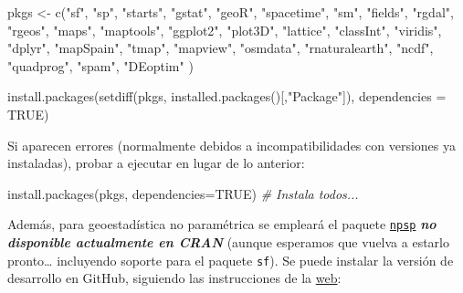 \documentclass[
  spanish,
]{book}
\newenvironment{Shaded}{\begin{snugshade}}{\end{snugshade}}
\newcommand{\AttributeTok}[1]{\textcolor[rgb]{0.77,0.63,0.00}{#1}}
\newcommand{\CommentTok}[1]{\textcolor[rgb]{0.56,0.35,0.01}{\textit{#1}}}
\newcommand{\ConstantTok}[1]{\textcolor[rgb]{0.00,0.00,0.00}{#1}}
\newcommand{\FunctionTok}[1]{\textcolor[rgb]{0.00,0.00,0.00}{#1}}
\newcommand{\NormalTok}[1]{#1}
\newcommand{\OtherTok}[1]{\textcolor[rgb]{0.56,0.35,0.01}{#1}}
\newcommand{\StringTok}[1]{\textcolor[rgb]{0.31,0.60,0.02}{#1}}
\theoremstyle{break}
\begin{document}
\begin{Shaded}
\begin{Highlighting}[]
\NormalTok{pkgs }\OtherTok{\textless{}{-}} \FunctionTok{c}\NormalTok{(}\StringTok{"sf"}\NormalTok{, }\StringTok{"sp"}\NormalTok{, }\StringTok{"starts"}\NormalTok{, }\StringTok{"gstat"}\NormalTok{, }\StringTok{"geoR"}\NormalTok{, }\StringTok{"spacetime"}\NormalTok{, }\StringTok{"sm"}\NormalTok{, }\StringTok{"fields"}\NormalTok{, }
          \StringTok{"rgdal"}\NormalTok{, }\StringTok{"rgeos"}\NormalTok{, }\StringTok{"maps"}\NormalTok{, }\StringTok{"maptools"}\NormalTok{, }\StringTok{"ggplot2"}\NormalTok{, }\StringTok{"plot3D"}\NormalTok{, }\StringTok{"lattice"}\NormalTok{, }
          \StringTok{"classInt"}\NormalTok{, }\StringTok{"viridis"}\NormalTok{, }\StringTok{"dplyr"}\NormalTok{, }\StringTok{"mapSpain"}\NormalTok{, }\StringTok{"tmap"}\NormalTok{, }\StringTok{"mapview"}\NormalTok{, }
          \StringTok{"osmdata"}\NormalTok{, }\StringTok{"rnaturalearth"}\NormalTok{, }\StringTok{"ncdf"}\NormalTok{, }\StringTok{"quadprog"}\NormalTok{, }\StringTok{"spam"}\NormalTok{, }\StringTok{"DEoptim"}\NormalTok{ )}

\FunctionTok{install.packages}\NormalTok{(}\FunctionTok{setdiff}\NormalTok{(pkgs, }\FunctionTok{installed.packages}\NormalTok{()[,}\StringTok{"Package"}\NormalTok{]), }\AttributeTok{dependencies =} \ConstantTok{TRUE}\NormalTok{)}
\end{Highlighting}
\end{Shaded}

Si aparecen errores (normalmente debidos a incompatibilidades con versiones ya instaladas), probar a ejecutar en lugar de lo anterior:

\begin{Shaded}
\begin{Highlighting}[]
\FunctionTok{install.packages}\NormalTok{(pkgs, }\AttributeTok{dependencies=}\ConstantTok{TRUE}\NormalTok{) }\CommentTok{\# Instala todos...}
\end{Highlighting}
\end{Shaded}

Además, para geoestadística no paramétrica se empleará el paquete \href{https://rubenfcasal.github.io/npsp}{\texttt{npsp}} \textbf{\emph{no disponible actualmente en CRAN}} (aunque esperamos que vuelva a estarlo pronto\ldots{} incluyendo soporte para el paquete \texttt{sf}).
Se puede instalar la versión de desarrollo en GitHub, siguiendo las instrucciones de la \href{https://rubenfcasal.github.io/npsp/\#installation}{web}:
\end{document}
